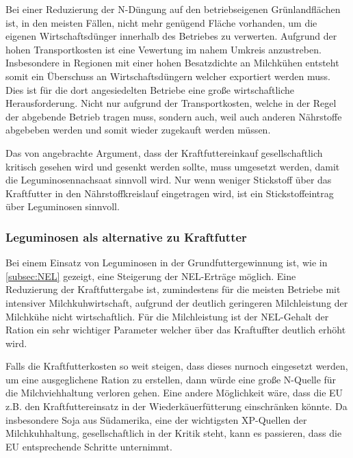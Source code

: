 Bei einer Reduzierung der N-Düngung auf den betriebseigenen Grünlandflächen ist, in den meisten Fällen, nicht mehr genügend Fläche vorhanden, um die eigenen Wirtschaftsdünger innerhalb des Betriebes zu verwerten.
Aufgrund der hohen Transportkosten ist eine Vewertung im nahem Umkreis anzustreben.
Insbesondere in Regionen mit einer hohen Besatzdichte an Milchkühen entsteht somit ein Überschuss an Wirtschaftsdüngern welcher exportiert werden muss.
Dies ist für die dort angesiedelten Betriebe eine große wirtschaftliche Herausforderung.
Nicht nur aufgrund der Transportkosten, welche in der Regel der abgebende Betrieb tragen muss, sondern auch, weil auch anderen Nährstoffe abgebeben werden und somit wieder zugekauft werden müssen.

Das von \textcite[33]{weggler2050leguminosen} angebrachte Argument, dass der Kraftfuttereinkauf gesellschaftlich kritisch gesehen wird und gesenkt werden sollte, muss umgesetzt werden, damit die Leguminosennachsaat sinnvoll wird.
Nur wenn weniger Stickstoff über das Kraftfutter in den Nährstoffkreislauf eingetragen wird, ist ein Stickstoffeintrag über Leguminosen sinnvoll.

\subsubsection{Leguminosen als alternative zu Kraftfutter}
\label{subsub:alternative}
Bei einem Einsatz von Leguminosen in der Grundfuttergewinnung ist, wie in \cref{subsec:NEL} gezeigt, eine Steigerung der \ac{NEL}-Erträge möglich.
Eine Reduzierung der Kraftfuttergabe ist, zumindestens für die meisten Betriebe mit intensiver Milchkuhwirtschaft, aufgrund der deutlich geringeren Milchleistung der Milchkühe nicht wirtschaftlich.
Für die Milchleistung ist der \ac{NEL}-Gehalt der Ration ein sehr wichtiger Parameter welcher über das Kraftuffter deutlich erhöht wird.

Falls die Kraftfutterkosten so weit steigen, dass dieses nurnoch eingesetzt werden, um eine ausgeglichene Ration zu erstellen, dann würde eine große N-Quelle für die Milchviehhaltung verloren gehen.
Eine andere Möglichkeit wäre, dass die \ac{EU} z.B. den Kraftfuttereinsatz in der Wiederkäuerfütterung einschränken könnte.
Da insbesondere Soja aus Südamerika, eine der wichtigsten \ac{XP}-Quellen der Milchkuhhaltung, gesellschaftlich in der Kritik steht, kann es passieren, dass die \ac{EU} entsprechende Schritte unternimmt.

